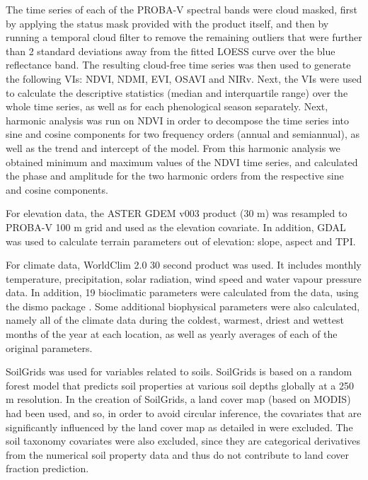 \documentclass[review,authoryear,3p]{elsarticle}
\begin{document}
The time series of each of the PROBA-V spectral bands were cloud masked, first by applying the status mask provided with the product itself, and then by running a temporal cloud filter to remove the remaining outliers that were further than 2 standard deviations away from the fitted \ac{LOESS} curve over the blue reflectance band.
The resulting cloud-free time series was then used to generate the following \glspl{VI}: \gls{NDVI}, \gls{NDMI}, \gls{EVI}, \gls{OSAVI} and \gls{NIRv}. Next, the \glspl{VI} were used to calculate the descriptive statistics (median and interquartile range) over the whole time series, as well as for each phenological season separately.
Next, harmonic analysis \citep{jakubauskas2001harmonic} was run on NDVI in order to decompose the time series into sine and cosine components for two frequency orders (annual and semiannual), as well as the trend and intercept of the model.
From this harmonic analysis we obtained minimum and maximum values of the \gls{NDVI} time series, and calculated the phase and amplitude for the two harmonic orders from the respective sine and cosine components.

For elevation data, the ASTER GDEM v003 \citep{ASTGTM003} product (30 m) was resampled to PROBA-V 100 m grid and used as the elevation covariate.
In addition, \gls{GDAL} \citep{gdal} was used to calculate terrain parameters out of elevation: slope, aspect and \ac{TPI}.

For climate data, WorldClim 2.0 30 second product \citep{worldclim2} was used.
It includes monthly temperature, precipitation, solar radiation, wind speed and water vapour pressure data.
In addition, 19 bioclimatic parameters were calculated from the data, using the dismo package \citep{dismo}.
Some additional biophysical parameters were also calculated, namely all of the climate data during the coldest, warmest, driest and wettest months of the year at each location, as well as yearly averages of each of the original parameters.

SoilGrids \citep{hengl_soilgrids250m_2017} was used for variables related to soils.
SoilGrids is based on a random forest model that predicts soil properties at various soil depths globally at a 250 m resolution.
In the creation of SoilGrids, a land cover map (based on MODIS) had been used, and so, in order to avoid circular inference, the covariates that are significantly influenced by the land cover map as detailed in \citet{hengl_soilgrids250m_2017} were excluded.
The soil taxonomy covariates were also excluded, since they are categorical derivatives from the numerical soil property data and thus do not contribute to land cover fraction prediction.
\end{document}
